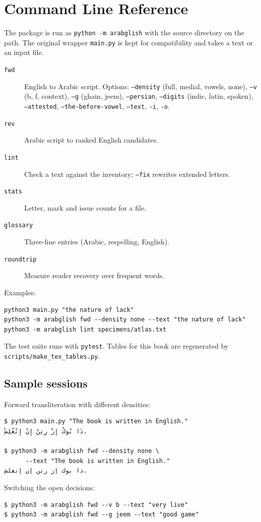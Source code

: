 \chapter{Command Line Reference}\label{app:cli}
The package is run as \texttt{python -m arabglish} with the source directory on the path. The original wrapper \texttt{main.py} is kept for compatibility and takes a text or an input file.

\begin{description}
\item[\texttt{fwd}] English to Arabic script. Options: \texttt{--density} (full, medial, vowels, none), \texttt{--v} (b, f, context), \texttt{--g} (ghain, jeem), \texttt{--persian}, \texttt{--digits} (indic, latin, spoken), \texttt{--attested}, \texttt{--the-before-vowel}, \texttt{--text}, \texttt{-i}, \texttt{-o}.
\item[\texttt{rev}] Arabic script to ranked English candidates.
\item[\texttt{lint}] Check a text against the inventory; \texttt{--fix} rewrites extended letters.
\item[\texttt{stats}] Letter, mark and issue counts for a file.
\item[\texttt{glossary}] Three-line entries (Arabic, respelling, English).
\item[\texttt{roundtrip}] Measure reader recovery over frequent words.
\end{description}

Examples:
\begin{verbatim}
python3 main.py "the nature of lack"
python3 -m arabglish fwd --density none --text "the nature of lack"
python3 -m arabglish lint specimens/atlas.txt
\end{verbatim}
The test suite runs with \texttt{pytest}. Tables for this book are regenerated by \texttt{scripts/make\_tex\_tables.py}.

\section{Sample sessions}
Forward transliteration with different densities:
\begin{verbatim}
$ python3 main.py "The book is written in English."
ذَا بُوكْ إِزْ رِتِنْ إِنْ إِنْغْلِشْ.

$ python3 -m arabglish fwd --density none \
      --text "The book is written in English."
ذا بوك إز رتن إن إنغلش.
\end{verbatim}

Switching the open decisions:
\begin{verbatim}
$ python3 -m arabglish fwd --v b --text "very live"
$ python3 -m arabglish fwd --g jeem --text "good game"
\end{verbatim}

